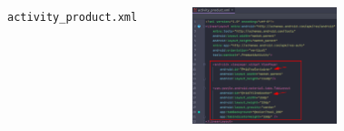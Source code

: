 \documentclass{beamer}
\begin{document}
\begin{frame}
\begin{columns}
\begin{figure}
        \end{figure}
        \indent \texttt{activity\_product.xml}
        \begin{figure}
            \centering
            \includegraphics[width=\textwidth]{images/36.png}
        \end{figure}
    \end{columns}
\end{frame}
\end{document}
